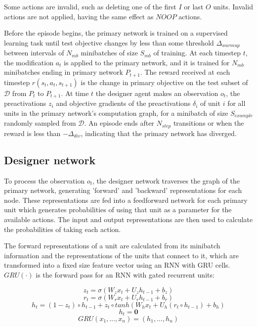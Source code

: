 \documentclass{article}[12px]
\begin{document}
Some actions are invalid, such as deleting one of the first \(I\) or last \(O\) units. Invalid actions are not applied, having the same effect as \(NOOP\) actions.

Before the episode begins, the primary network is trained on a supervised learning task until test objective changes by less than some threshold \(\Delta_{warmup}\) between intervals of \(N_{mb}\) minibatches of size \(S_{mb}\) of training. At each timestep \(t\), the modification \(a_t\) is applied to the primary network, and it is trained for \(N_{mb}\) minibatches ending in primary network \(P_{t+1}\). The reward received at each timestep \(r(s_t, a_t, s_{t+1})\) is the change in primary objective on the test subset of \(\mathcal{D}\) from \(P_t\) to \(P_{t+1}\). At time \(t\) the designer agent makes an observation \(o_t\), the preactivations \(z_i\) and objective gradients of the preactivations \(\delta_i\) of unit \(i\) for all units in the primary network's computation graph, for a minibatch of size \(S_{example}\) randomly sampled from \(\mathcal{D}\). An episode ends after \(N_{step}\) transitions or when the reward is less than \(-\Delta_{div}\), indicating that the primary network has diverged.

\subsection{Designer network}

To process the observation \(o_t\), the designer network traverses the graph of the primary network, generating 'forward' and 'backward' representations for each node. These representations are fed into a feedforward network for each primary unit which generates probabilities of using that unit as a parameter for the available actions. The input and output representations are then used to calculate the probabilities of taking each action.

The forward representations of a unit are calculated from its minibatch information and the representations of the units that connect to it, which are transformed into a fixed size feature vector using an RNN with GRU cells. \(GRU(\cdot)\) is the forward pass for an RNN with gated recurrent units:

\begin{equation}
  z_t = \sigma(W_zx_t + U_zh_{t-1} + b_z)
\end{equation}
\begin{equation}
  r_t = \sigma(W_rx_t + U_rh_{t-1} + b_r)
\end{equation}
\begin{equation}
  h_t = (1-z_t) \circ h_{t-1} + z_t \circ tanh(W_hx_t + U_h(r_t \circ h_{t-1}) + b_h)
\end{equation}
\begin{equation}
  h_t = \mathbf{0}
\end{equation}
\begin{equation}
  GRU(x_1, \ldots, x_n) = (h_1, \ldots, h_n)
\end{equation}
\end{document}
